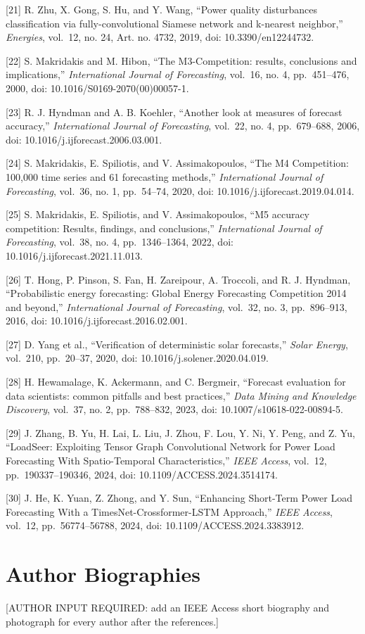 \documentclass[
  10pt,
  a4paper,
]{article}
\begin{document}
{[}21{]} R. Zhu, X. Gong, S. Hu, and Y. Wang, ``Power quality
disturbances classification via fully-convolutional Siamese network and
k-nearest neighbor,'' \emph{Energies}, vol.~12, no. 24, Art. no. 4732,
2019, doi: 10.3390/en12244732.

{[}22{]} S. Makridakis and M. Hibon, ``The M3-Competition: results,
conclusions and implications,'' \emph{International Journal of
Forecasting}, vol.~16, no. 4, pp.~451--476, 2000, doi:
10.1016/S0169-2070(00)00057-1.

{[}23{]} R. J. Hyndman and A. B. Koehler, ``Another look at measures of
forecast accuracy,'' \emph{International Journal of Forecasting},
vol.~22, no. 4, pp.~679--688, 2006, doi:
10.1016/j.ijforecast.2006.03.001.

{[}24{]} S. Makridakis, E. Spiliotis, and V. Assimakopoulos, ``The M4
Competition: 100,000 time series and 61 forecasting methods,''
\emph{International Journal of Forecasting}, vol.~36, no. 1, pp.~54--74,
2020, doi: 10.1016/j.ijforecast.2019.04.014.

{[}25{]} S. Makridakis, E. Spiliotis, and V. Assimakopoulos, ``M5
accuracy competition: Results, findings, and conclusions,''
\emph{International Journal of Forecasting}, vol.~38, no. 4,
pp.~1346--1364, 2022, doi: 10.1016/j.ijforecast.2021.11.013.

{[}26{]} T. Hong, P. Pinson, S. Fan, H. Zareipour, A. Troccoli, and R.
J. Hyndman, ``Probabilistic energy forecasting: Global Energy
Forecasting Competition 2014 and beyond,'' \emph{International Journal
of Forecasting}, vol.~32, no. 3, pp.~896--913, 2016, doi:
10.1016/j.ijforecast.2016.02.001.

{[}27{]} D. Yang et al., ``Verification of deterministic solar
forecasts,'' \emph{Solar Energy}, vol.~210, pp.~20--37, 2020, doi:
10.1016/j.solener.2020.04.019.

{[}28{]} H. Hewamalage, K. Ackermann, and C. Bergmeir, ``Forecast
evaluation for data scientists: common pitfalls and best practices,''
\emph{Data Mining and Knowledge Discovery}, vol.~37, no. 2,
pp.~788--832, 2023, doi: 10.1007/s10618-022-00894-5.

{[}29{]} J. Zhang, B. Yu, H. Lai, L. Liu, J. Zhou, F. Lou, Y. Ni, Y.
Peng, and Z. Yu, ``LoadSeer: Exploiting Tensor Graph Convolutional
Network for Power Load Forecasting With Spatio-Temporal
Characteristics,'' \emph{IEEE Access}, vol.~12, pp.~190337--190346,
2024, doi: 10.1109/ACCESS.2024.3514174.

{[}30{]} J. He, K. Yuan, Z. Zhong, and Y. Sun, ``Enhancing Short-Term
Power Load Forecasting With a TimesNet-Crossformer-LSTM Approach,''
\emph{IEEE Access}, vol.~12, pp.~56774--56788, 2024, doi:
10.1109/ACCESS.2024.3383912.

\section{Author Biographies}\label{author-biographies}

{[}AUTHOR INPUT REQUIRED: add an IEEE Access short biography and
photograph for every author after the references.{]}
\end{document}
